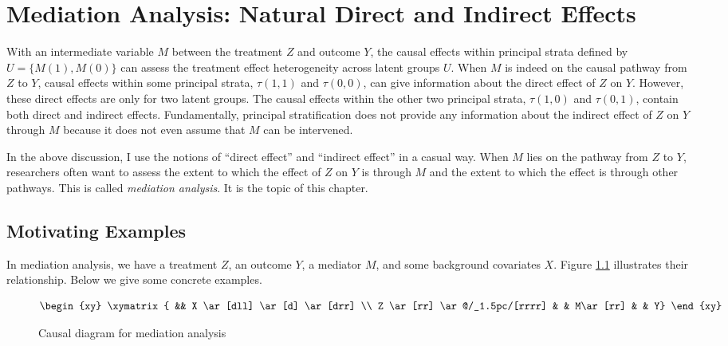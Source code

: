  
\chapter{ Mediation Analysis: Natural Direct and Indirect Effects}
 \label{chapter::mediation}




With an intermediate variable $M$ between the treatment $Z$ and outcome $Y$,  the causal effects within principal strata defined by $U = \{  M(1), M(0) \}$ can assess the treatment effect heterogeneity across latent groups $U$. When $M$ is indeed on the causal pathway from $Z$ to $Y$, causal effects within some principal strata, $\tau(1,1)$ and $ \tau(0,0)$, can give information about the direct effect of $Z$ on $Y$. However, these direct effects are only for two latent groups. The causal effects within the other two principal strata, $\tau(1,0)$ and $ \tau(0,1)$, contain both direct and indirect effects. Fundamentally, principal stratification does not provide any information about the indirect effect of $Z$ on $Y$ through $M$ because it does not even assume that $M$ can be intervened. 



In the above discussion, I use the notions of ``direct effect'' and ``indirect effect'' in a casual way. When $M$ lies on the pathway from $Z$ to $Y$, researchers often want to assess the extent to which the effect of $Z$ on $Y$ is through $M$ and the extent to which the effect is through other pathways. This is called {\it mediation analysis}. It is the topic of this chapter. 



\section{Motivating Examples}





In mediation analysis, we have a treatment $Z$, an outcome $Y$, a mediator $M$, and some background covariates $X$. Figure \ref{fg::mediationDAG} illustrates their relationship. Below we give some concrete examples. 



\begin{figure}[ht]
\centering
$$
\begin{xy}
\xymatrix{
&& X \ar[dll] \ar[d] \ar[drr] \\
Z \ar[rr] \ar@/_1.5pc/[rrrr] & & M\ar[rr] & & Y}
\end{xy}
$$
\caption{Causal diagram for mediation analysis}\label{fg::mediationDAG}
\end{figure}


